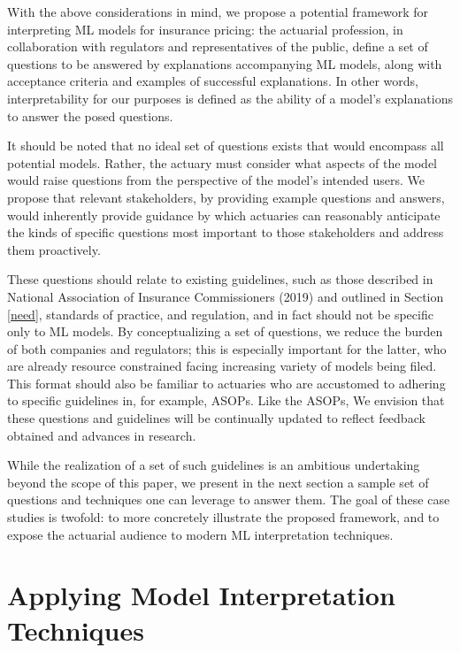 \documentclass[preprint, 3p, twocolumn, letterpaper, 10pt]{elsarticle} %
\begin{document}
With the above considerations in mind, we propose a potential framework for
interpreting ML models for insurance pricing: the actuarial profession, in
collaboration with regulators and representatives of the public, define a set
of questions to be answered by explanations accompanying ML models, along
with acceptance criteria and examples of successful explanations. In other
words, interpretability for our purposes is defined as the ability of a model's
explanations to answer the posed questions.

It should be noted that no ideal set of questions exists that would encompass
all potential models. Rather, the actuary must consider what aspects of the
model would raise questions from the perspective of the model's intended users.
We propose that relevant stakeholders, by providing example questions and
answers, would inherently provide guidance by which actuaries can reasonably
anticipate the kinds of specific questions most important to those stakeholders
and address them proactively.

These questions should relate to existing guidelines, such as those described in
National Association of Insurance Commissioners (2019) and outlined in Section \ref{need}, standards of practice, and
regulation, and in fact should not be specific only to ML models. By
conceptualizing a set of questions, we reduce the burden of both companies and
regulators; this is especially important for the latter, who are already
resource constrained facing increasing variety of models being filed. This
format should also be familiar to actuaries who are accustomed to adhering to
specific guidelines in, for example, ASOPs. Like the ASOPs, We envision that
these questions and guidelines will be continually updated to reflect feedback
obtained and advances in research.

While the realization of a set of such guidelines is an ambitious undertaking
beyond the scope of this paper, we present in the next section a sample set of
questions and techniques one can leverage to answer them. The goal of these case
studies is twofold: to more concretely illustrate the proposed framework, and
to expose the actuarial audience to modern ML interpretation techniques.

\hypertarget{application}{%
\section{Applying Model Interpretation Techniques}\label{application}}
\end{document}
